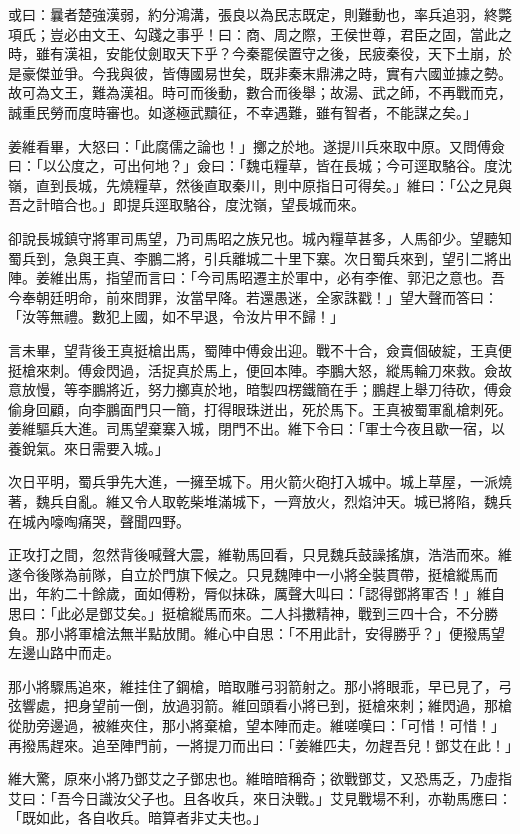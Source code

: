 或曰：曩者楚強漢弱，約分鴻溝，張良以為民志既定，則難動也，率兵追羽，終斃項氏；豈必由文王、勾踐之事乎！曰：商、周之際，王侯世尊，君臣之固，當此之時，雖有漢祖，安能仗劍取天下乎？今秦罷侯置守之後，民疲秦役，天下土崩，於是豪傑並爭。今我與彼，皆傳國易世矣，既非秦末鼎沸之時，實有六國並據之勢。故可為文王，難為漢祖。時可而後動，數合而後舉；故湯、武之師，不再戰而克，誠重民勞而度時審也。如遂極武黷征，不幸遇難，雖有智者，不能謀之矣。」

姜維看畢，大怒曰：「此腐儒之論也！」擲之於地。遂提川兵來取中原。又問傅僉曰：「以公度之，可出何地？」僉曰：「魏屯糧草，皆在長城；今可逕取駱谷。度沈嶺，直到長城，先燒糧草，然後直取秦川，則中原指日可得矣。」維曰：「公之見與吾之計暗合也。」即提兵逕取駱谷，度沈嶺，望長城而來。

卻說長城鎮守將軍司馬望，乃司馬昭之族兄也。城內糧草甚多，人馬卻少。望聽知蜀兵到，急與王真、李鵬二將，引兵離城二十里下寨。次日蜀兵來到，望引二將出陣。姜維出馬，指望而言曰：「今司馬昭遷主於軍中，必有李傕、郭汜之意也。吾今奉朝廷明命，前來問罪，汝當早降。若還愚迷，全家誅戳！」望大聲而答曰：「汝等無禮。數犯上國，如不早退，令汝片甲不歸！」

言未畢，望背後王真挺槍出馬，蜀陣中傅僉出迎。戰不十合，僉賣個破綻，王真便挺槍來刺。傅僉閃過，活捉真於馬上，便回本陣。李鵬大怒，縱馬輪刀來救。僉故意放慢，等李鵬將近，努力擲真於地，暗製四楞鐵簡在手；鵬趕上舉刀待砍，傅僉偷身回顧，向李鵬面門只一簡，打得眼珠迸出，死於馬下。王真被蜀軍亂槍刺死。姜維驅兵大進。司馬望棄寨入城，閉門不出。維下令曰：「軍士今夜且歇一宿，以養銳氣。來日需要入城。」

次日平明，蜀兵爭先大進，一擁至城下。用火箭火砲打入城中。城上草屋，一派燒著，魏兵自亂。維又令人取乾柴堆滿城下，一齊放火，烈焰沖天。城已將陷，魏兵在城內嚎啕痛哭，聲聞四野。

正攻打之間，忽然背後喊聲大震，維勒馬回看，只見魏兵鼓譟搖旗，浩浩而來。維遂令後隊為前隊，自立於門旗下候之。只見魏陣中一小將全裝貫帶，挺槍縱馬而出，年約二十餘歲，面如傅粉，脣似抹硃，厲聲大叫曰：「認得鄧將軍否！」維自思曰：「此必是鄧艾矣。」挺槍縱馬而來。二人抖擻精神，戰到三四十合，不分勝負。那小將軍槍法無半點放閒。維心中自思：「不用此計，安得勝乎？」便撥馬望左邊山路中而走。

那小將驟馬追來，維挂住了鋼槍，暗取雕弓羽箭射之。那小將眼乖，早已見了，弓弦響處，把身望前一倒，放過羽箭。維回頭看小將已到，挺槍來刺；維閃過，那槍從肋旁邊過，被維夾住，那小將棄槍，望本陣而走。維嗟嘆曰：「可惜！可惜！」再撥馬趕來。追至陣門前，一將提刀而出曰：「姜維匹夫，勿趕吾兒！鄧艾在此！」

維大驚，原來小將乃鄧艾之子鄧忠也。維暗暗稱奇；欲戰鄧艾，又恐馬乏，乃虛指艾曰：「吾今日識汝父子也。且各收兵，來日決戰。」艾見戰場不利，亦勒馬應曰：「既如此，各自收兵。暗算者非丈夫也。」

